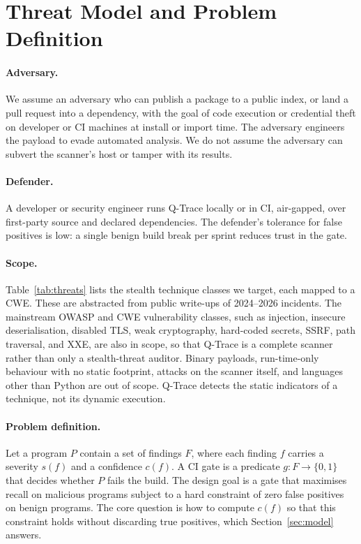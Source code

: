 \documentclass[runningheads]{llncs}
\begin{document}
\section{Threat Model and Problem Definition}\label{sec:threat}
\paragraph{Adversary.} We assume an adversary who can publish a package to a
public index, or land a pull request into a dependency, with the goal of code
execution or credential theft on developer or CI machines at install or import
time. The adversary engineers the payload to evade automated analysis. We do not
assume the adversary can subvert the scanner's host or tamper with its results.

\paragraph{Defender.} A developer or security engineer runs Q-Trace locally or in
CI, air-gapped, over first-party source and declared dependencies. The defender's
tolerance for false positives is low: a single benign build break per sprint
reduces trust in the gate.

\paragraph{Scope.} Table~\ref{tab:threats} lists the stealth technique classes we
target, each mapped to a CWE. These are abstracted from public write-ups of
2024--2026 incidents. The mainstream OWASP and CWE vulnerability classes, such as
injection, insecure deserialisation, disabled TLS, weak cryptography, hard-coded
secrets, SSRF, path traversal, and XXE, are also in scope, so that Q-Trace is a
complete scanner rather than only a stealth-threat auditor. Binary payloads,
run-time-only behaviour with no static footprint, attacks on the scanner itself,
and languages other than Python are out of scope. Q-Trace detects the static
indicators of a technique, not its dynamic execution.

\paragraph{Problem definition.} Let a program $P$ contain a set of findings $F$,
where each finding $f$ carries a severity $s(f)$ and a confidence $c(f)$. A CI
gate is a predicate $g: F \to \{0,1\}$ that decides whether $P$ fails the build.
The design goal is a gate that maximises recall on malicious programs subject to a
hard constraint of zero false positives on benign programs. The core question is
how to compute $c(f)$ so that this constraint holds without discarding true
positives, which Section~\ref{sec:model} answers.
\end{document}
